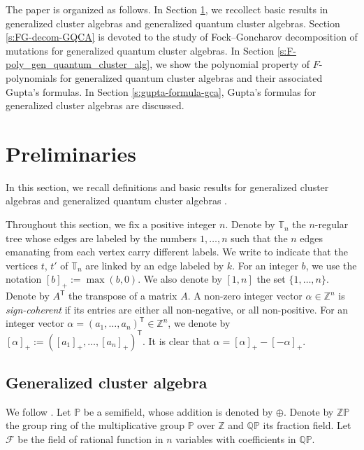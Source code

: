 \documentclass[pdftex]{sigma}
\newcommand{\Z}{\mathbb{Z}}
\numberwithin{equation}{section}
\begin{document}
The paper is organized as follows. In Section \ref{Preliminaries}, we recollect basic results in generalized cluster algebras and generalized quantum cluster algebras. Section \ref{s:FG-decom-GQCA} is devoted to the study of Fock--Goncharov decomposition of mutations for generalized quantum cluster algebras. In Section \ref{s:F-poly_gen_quantum_cluster_alg}, we show the polynomial property of $F$-polynomials for generalized quantum cluster algebras and their associated Gupta's formulas. In Section \ref{s:gupta-formula-gca}, Gupta's formulas for generalized cluster algebras are discussed.

 \section{Preliminaries}\label{Preliminaries}
 In this section, we recall definitions and basic results for generalized cluster algebras \cite{Chekhov_Shapiro} and generalized quantum cluster algebras \cite{BCDX2018}.

 Throughout this section, we fix a positive integer $n$. Denote by $\mathbb{T}_n$ the $n$-regular tree whose edges are labeled by the numbers $1,\dots,n$ such that the $n$ edges emanating from each vertex carry different labels. We write
  to indicate that the vertices $t$, $t'$ of $\mathbb{T}_n$ are linked by an edge labeled by $k$.
For an integer $b$, we use the notation $[b]_+:=\max(b,0)$. We also denote by $[1,n]$ the set $\{1,\dots,n\}$. Denote by $A^{\mathsf T}$ the transpose of a matrix $A$. A non-zero integer vector $\alpha\in \Z^n$ is {\it sign-coherent} if its entries are either all non-negative, or all non-positive.
For an integer vector $\alpha=(a_1,\dots,a_n)^{\mathsf T}\in\mathbb{Z}^n$, we denote by $[\alpha]_+:=([a_1]_+,\dots,[a_n]_+)^{\mathsf T}$. It is clear that $\alpha=[\alpha]_+-[-\alpha]_+$.

\subsection{Generalized cluster algebra}\label{S2}
 We follow \cite{Nakanishi14}.
Let $\mathbb{P}$ be a semifield, whose addition is denoted by $\oplus$. Denote by $\mathbb{ZP}$ the group ring of the multiplicative group $\mathbb{P}$ over $\mathbb{Z}$ and $\mathbb{QP}$ its fraction field. Let
$\mathcal{F}$ be the field of rational function in $n$ variables with coefficients in $\mathbb{QP}$.
\end{document}
